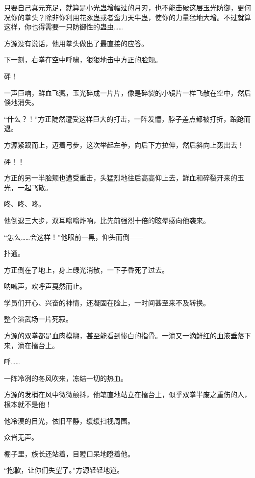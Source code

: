 \begin{this_body}
只要自己真元充足，就算是小光蛊增幅过的月刃，也不能击破这层玉光防御，更何况你的拳头？除非你利用花豕蛊或者蛮力天牛蛊，使你的力量猛地大增。不过就算这样，你也得需要一只防御性的蛊虫……

方源没有说话，他用拳头做出了最直接的应答。

下一刻，右拳在空中呼啸，狠狠地击中方正的脸颊。

砰！

一声巨响，鲜血飞溅，玉光碎成一片片，像是碎裂的小镜片一样飞散在空中，然后倏地消失。

“什么？！”方正陡然遭受这样巨大的打击，一阵发懵，脖子差点都被打折，踉跄而退。

方源紧跟而上，迈着弓步，这次举起左拳，向后下方拉伸，然后斜向上轰出去！

砰！！

方正的另一半脸颊也遭受重击，头猛烈地往后高高仰上去，鲜血和碎裂开来的玉光，一起飞散。

咚、咚、咚。

他倒退三大步，双耳嗡嗡炸响，比先前强烈十倍的眩晕感向他袭来。

“怎么……会这样！”他眼前一黑，仰头而倒――

扑通。

方正倒在了地上，身上绿光消散，一下子昏死了过去。

呐喊声，欢呼声戛然而止。

学员们开心、兴奋的神情，还凝固在脸上，一时间甚至来不及转换。

整个演武场一片死寂。

方源的双拳都是血肉模糊，甚至能看到惨白的指骨。一滴又一滴鲜红的血液垂落下来，滴在擂台上。

呼……

一阵冷冽的冬风吹来，冻结一切的热血。

方源的发梢在风中微微颤抖，他笔直地站立在擂台上，似乎双拳半废之重伤的人，根本就不是他！

他冷漠的目光，依旧平静，缓缓扫视周围。

众皆无声。

棚子里，族长还站着，目瞪口呆地瞪着他。

“抱歉，让你们失望了。”方源轻轻地道。

\end{this_body}

